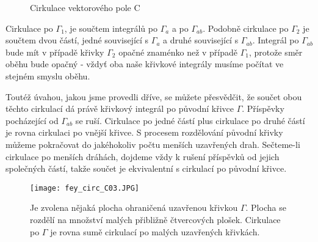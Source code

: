     \begin{figure}[ht!]
    \centering
      \hspace{0.1\textwidth}                                                                         
    \caption{Cirkulace vektorového pole C}
    \end{figure} 
 
    Cirkulace po \(\Gamma_1\), je součtem integrálů po \(\Gamma_a\) a po \(\Gamma_{ab}\). Podobně 
    cirkulace po \(\Gamma_2\) je součtem dvou částí, jedné související s \(\Gamma_a\) a druhé 
    související s \(\Gamma_{ab}\). Integrál po \(\Gamma_{ab}\) bude mít v případě křivky 
    \(\Gamma_2\) opačné znaménko než v případě \(\Gamma_1\), protože směr oběhu bude opačný - vždyť 
    oba naše křivkové integrály musíme počítat ve stejném smyslu oběhu.
        
    Toutéž úvahou, jakou jsme provedli dříve, se můžete přesvědčit, že součet obou těchto cirkulací
    dá právě křivkový integrál po původní křivce \(\Gamma\). Příspěvky pocházející od 
    \(\Gamma_{ab}\) se ruší. Cirkulace po jedné částí plus cirkulace po druhé částí je rovna 
    cirkulaci po vnější křivce. S procesem rozdělování původní křivky můžeme pokračovat do 
    jakéhokoliv počtu menších uzavřených drah. Sečteme-li cirkulace po menších dráhách, dojdeme vždy 
    k rušení příspěvků od jejich společných částí, takže součet je ekvivalentní s cirkulací po 
    původní křivce.       

    \begin{figure}
      \centering
      \texttt{[image: fey\_circ\_C03.JPG]}
      \caption{Je zvolena nějaká plocha ohraničená uzavřenou křivkou \(\Gamma\). Plocha se rozdělí  
               na množství malých přibližně čtvercových plošek. Cirkulace po \(\Gamma\) je rovna 
               sumě cirkulací po malých uzavřených křivkách.}
      \label{fyz:fig_fey_circ_C03} 
    \end{figure}

